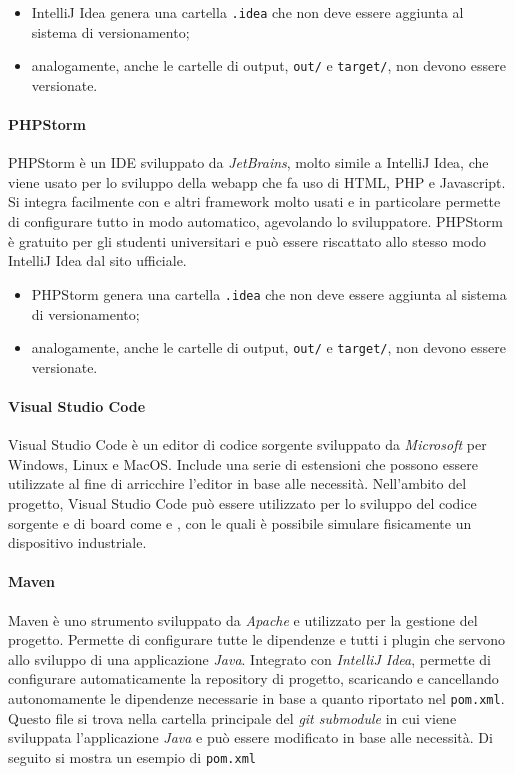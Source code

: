 					\begin{itemize}
						\item IntelliJ Idea genera una cartella \verb!.idea! che non deve essere aggiunta al sistema di versionamento;
						\item analogamente, anche le cartelle di output, \verb!out/! e \verb!target/!, non devono essere versionate.
					\end{itemize}

				\paragraph{PHPStorm}
					PHPStorm è un IDE sviluppato da \textit{JetBrains}, molto simile a IntelliJ Idea, che viene usato per lo sviluppo della webapp che fa uso di HTML, PHP e Javascript. Si integra facilmente con  e altri framework molto usati e in particolare permette di configurare tutto in modo automatico, agevolando lo sviluppatore. PHPStorm è gratuito per gli studenti universitari e può essere riscattato allo stesso modo IntelliJ Idea dal sito ufficiale. 

					\begin{itemize}
						\item PHPStorm genera una cartella \verb!.idea! che non deve essere aggiunta al sistema di versionamento;
						\item analogamente, anche le cartelle di output, \verb!out/! e \verb!target/!, non devono essere versionate.
					\end{itemize}

				\paragraph{Visual Studio Code} 
					Visual Studio Code è un editor di codice sorgente sviluppato da \textit{Microsoft} per Windows, Linux e MacOS. Include una serie di estensioni che possono essere utilizzate al fine di arricchire l'editor in base alle necessità. Nell'ambito del progetto, Visual Studio Code può essere utilizzato per lo sviluppo del codice sorgente e di board come  e , con le quali è possibile simulare fisicamente un dispositivo industriale.
				
				\paragraph{Maven}
					Maven è uno strumento sviluppato da \textit{Apache} e utilizzato per la gestione del progetto. Permette di configurare tutte le dipendenze e tutti i plugin che servono allo sviluppo di una applicazione \textit{Java}. Integrato con \textit{IntelliJ Idea}, permette di configurare automaticamente la repository di progetto, scaricando e cancellando autonomamente le dipendenze necessarie in base a quanto riportato nel \verb!pom.xml!. Questo file si trova nella cartella principale del \textit{git submodule} in cui viene sviluppata l'applicazione \textit{Java} e può essere modificato in base alle necessità. Di seguito si mostra un esempio di \verb!pom.xml!


